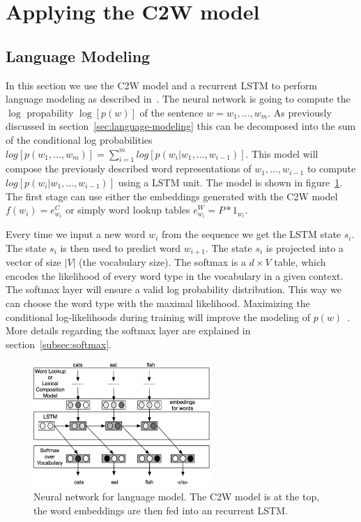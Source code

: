 \section{Applying the C2W model}

\subsection{Language Modeling}
\label{subsec:language-model-c2w}

In this section we use the C2W model and a recurrent LSTM to perform language modeling as 
described in~\cite{DBLP:journals/corr/LingLMAADBT15}.
The neural network is going to compute the $\log$ propability $\log[ p(\mathit{w}) ]$ of the 
sentence $\mathit{w} = w_1, \dots, w_m$. As previously discussed in section~\ref{sec:language-modeling} this can be 
decomposed into the sum of the conditional log probabilities $log[ p(w_1,\dots,w_m) ] = \sum_{i=1}^{m} log[ p(w_i | w_1,\dots,w_{i-1}) ]$.
This model will compose the previously described word representations of $w_1,\dots,w_{i-1}$ to compute 
$log[ p(w_i | w_1,\dots,w_{i-1}) ]$ using a LSTM unit.
The model is shown in figure~\ref{fig:c2w-language-model}. The first stage can use either the embeddings generated with the C2W model
$f(w_i) = e_{w_i}^C $ or simply word lookup tables $e_{w_i}^W = P * 1_{w_i}$.

Every time we input a new word $w_i$ from the sequence we get the LSTM state $s_i$. The state $s_i$ is then used to predict word $w_{i+1}$.
The state $s_i$ is projected into a vector of size $|V|$ (the vocabulary size). The softmax is a $d \times V$ table, 
which encodes the likelihood of every word type in the vocabulary in a given context. 
The softmax layer will ensure a valid log probability distribution. This way we can choose the word type with the maximal likelihood.
Maximizing the conditional log-likelihoods during training will improve the modeling 
of $p(\mathit{w})$~\cite{DBLP:conf/interspeech/MikolovKBCK10}.
More details regarding the softmax layer are explained in section~\ref{subsec:softmax}.

\begin{figure}[H]
\begin{center}
  \includegraphics[width=0.6\textwidth]{./img/c2w-language-model}
  \caption{Neural network for language model. The C2W model is at the top, the word embeddings are then fed into an recurrent LSTM.}
  \label{fig:c2w-language-model}
\end{center}
\end{figure}


